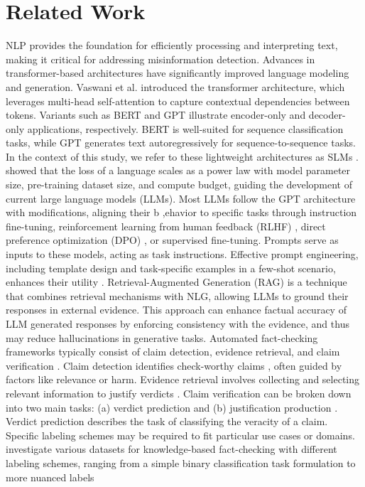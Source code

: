 \section{Related Work}
NLP provides the foundation for efficiently processing and interpreting text, making it critical for addressing misinformation detection. Advances in transformer-based architectures have significantly improved language modeling and generation. Vaswani et al. \cite{vaswani2023AttentionAllYou} introduced the transformer architecture, which leverages multi-head self-attention to capture contextual dependencies between tokens. Variants such as BERT \cite{devlin2019BERTPretrainingDeep} and GPT \cite{radford2018ImprovingLanguageUnderstanding} illustrate encoder-only and decoder-only applications, respectively. BERT is well-suited for sequence classification tasks, while GPT generates text autoregressively for sequence-to-sequence tasks. In the context of this study, we refer to these lightweight architectures as SLMs \cite{nguyen2024SurveySmallLanguage}. \\\citet{kaplan2020ScalingLawsNeural} showed that the loss of a language scales as a power law with model parameter size, pre-training dataset size, and compute budget, guiding the development of current large language models (LLMs). Most LLMs follow the GPT architecture with modifications, aligning their b ,ehavior to specific tasks through instruction fine-tuning, reinforcement learning from human feedback (RLHF) \cite{ouyang2022TrainingLanguageModelsa}, direct preference optimization (DPO) \cite{rafailov2023DirectPreferenceOptimization}, or supervised fine-tuning. Prompts serve as inputs to these models, acting as task instructions. Effective prompt engineering, including template design and task-specific examples in a few-shot scenario, enhances their utility \cite{schulhoff2024PromptReportSystematic, brown2020LanguageModelsAre}. Retrieval-Augmented Generation (RAG) \cite{lewis2021RetrievalAugmentedGenerationKnowledgeIntensive} is a technique that combines retrieval mechanisms with NLG, allowing LLMs to ground their responses in external evidence. This approach can enhance factual accuracy of LLM generated responses by enforcing consistency with the evidence, and thus may reduce hallucinations in generative tasks. Automated fact-checking frameworks typically consist of claim detection, evidence retrieval, and claim verification \cite{guo2022SurveyAutomatedFactChecking}. Claim detection identifies check-worthy claims \cite{hassan2017AutomatedFactCheckingDetecting}, often guided by factors like relevance or harm. Evidence retrieval involves collecting and selecting relevant information to justify verdicts \cite{ferreira2016EmergentNovelDataset}. Claim verification can be broken down into two main tasks: (a) verdict prediction and (b) justification production \cite{guo2022SurveyAutomatedFactChecking}. Verdict prediction describes the task of classifying the veracity of a claim. Specific labeling schemes may be required to fit particular use cases or domains. \citet{augenstein2019MultiFCRealWorldMultiDomain} investigate various datasets for knowledge-based fact-checking with different labeling schemes, ranging from a simple binary classification task formulation to more nuanced labels 